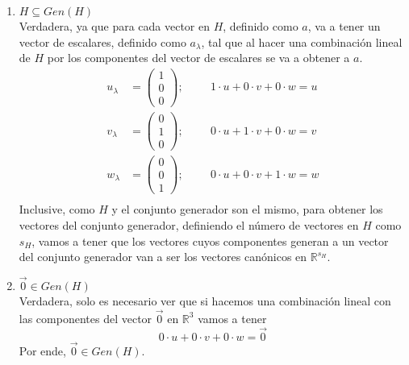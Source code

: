 \documentclass{article}
\begin{document}
\begin{enumerate}
\begin{enumerate}[label=\listAlph]
            \item \(H \subseteq Gen\left(H\right)\) \\
                Verdadera, ya que para cada vector en \(H\), definido como \(a\), va a tener un vector de escalares, definido como \(a_{\lambda}\), tal que 
                al hacer una combinación lineal de \(H\) por los componentes del vector de escalares se va a obtener a \(a\).
                \[
                    \begin{aligned}
                        u_{\lambda} &= \begin{pmatrix} 1 \\ 0 \\ 0 \end{pmatrix}; \hspace{1cm}
                        1 \cdot u + 0 \cdot v + 0 \cdot w = u \\
                        v_{\lambda} &= \begin{pmatrix} 0 \\ 1 \\ 0 \end{pmatrix}; \hspace{1cm}
                        0 \cdot u + 1 \cdot v + 0 \cdot w = v \\
                        w_{\lambda} &= \begin{pmatrix} 0 \\ 0 \\ 1 \end{pmatrix}; \hspace{1cm}
                        0 \cdot u + 0 \cdot v + 1 \cdot w = w \\
                    \end{aligned}
                \]
                Inclusive, como \(H\) y el conjunto generador son el mismo, para obtener los vectores del conjunto generador, definiendo el número de vectores en \(H\) como \(s_H\),
                vamos a tener que los vectores cuyos componentes generan a un vector del conjunto generador van a ser los vectores canónicos en \(\mathbb{R}^{s_H}\).
            \item \(\vec{0} \in Gen\left(H\right)\) \\
                Verdadera, solo es necesario ver que si hacemos una combinación lineal con las componentes del vector \(\vec{0}\) en \(\mathbb{R}^3\) vamos a tener
                \[
                    0 \cdot u + 0 \cdot v + 0 \cdot w = \vec{0}
                \]
                Por ende, \(\vec{0} \in Gen\left(H\right)\).

\end{enumerate}
\end{enumerate}
\end{document}

